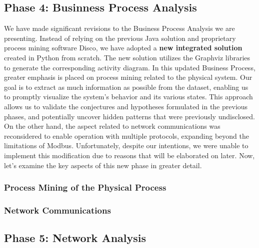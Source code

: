 \subsection{Phase 4: Businness Process Analysis}
\label{subsec:4_improve_bpa}
We have made significant revisions to the Business Process Analysis we are presenting. Instead of relying on the previous Java solution and proprietary process mining software Disco, we have adopted a \textbf{new integrated solution} created in Python from scratch. The new solution utilizes the Graphviz libraries to generate the corresponding activity diagram.\newline \newline
In this updated Business Process, greater emphasis is placed on process mining related to the physical system. Our goal is to extract as much information as possible from the dataset, enabling us to promptly visualize the system's behavior and its various states. This approach allows us to validate the conjectures and hypotheses formulated in the previous phases, and potentially uncover hidden patterns that were previously undisclosed.\newline
On the other hand, the aspect related to network communications was reconsidered to enable operation with multiple protocols, expanding beyond the limitations of Modbus. Unfortunately, despite our intentions, we were unable to implement this modification due to reasons that will be elaborated on later.\newline \newline
Now, let's examine the key aspects of this new phase in greater detail.

\subsubsection{Process Mining of the Physical Process}
\label{subsub:4_proc_minining_phy}

\subsubsection{Network Communications}
\label{subsub:4_proc_mining_net}

\subsection{Phase 5: Network Analysis}
\label{subsec:4_network_analysis}

\vfill
\nolinenumbers